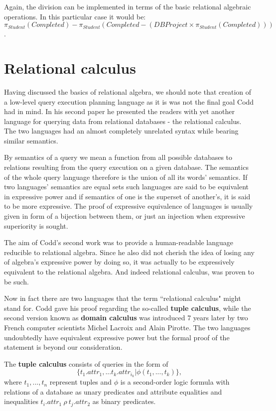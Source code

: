 \documentclass[12pt]{article}
\begin{document}
Again, the division can be implemented in terms of the basic relational algebraic operations.
In this particular case it would be: $$\pi_{Student}(Completed) - \pi_{Student}(Completed -
(DBProject \times \pi_{Student}(Completed)))$$.

\section{Relational calculus}

Having discussed the basics of relational algebra, we should note that
creation of a low-level query execution planning language as it is
was not the final goal Codd had in mind. In his second paper he presented the readers with yet
another language for querying data from relational databases - the relational calculus.
The two languages had an almost completely unrelated syntax while bearing similar semantics.

By semantics of a query we mean a function from all possible databases to relations resulting
from the query execution on a given database. The semantics of the whole query language therefore
is the union of all its words' semantics. If two languages' semantics are equal sets such languages
are said to be equivalent in expressive power and if semantics of one is the superset of another's,
it is said to be more expressive. The proof of expressive equivalence of languages is usually given in form of
a bijection between them, or just an injection when expressive superiority is sought.

The aim of Codd's second work was to provide a human-readable language reducible to relational
algebra. Since he also did not cherish the idea of losing any of algebra's expressive power
by doing so, it was actually to be expressively equivalent to the relational algebra.
And indeed relational calculus, was proven to be such.

Now in fact there are two languages that the term ``relational calculus" might stand for. Codd gave his proof
regarding the so-called \textbf{tuple calculus}, while the second version known as \textbf{domain calculus}
was introduced 7 years later by two French computer scientists Michel Lacroix and Alain Pirotte.
The two languages undoubtedly have equivalent expressive power but the formal proof of the statement is
beyond our consideration.

The \textbf{tuple calculus} consists of queries in the form of
$$\{t_1.attr_1, ... t_k.attr_{i_k} | \phi(t_1, ..., t_k)\},$$
where $t_1, ..., t_n$ represent tuples
and $\phi$ is a second-order logic formula with relations of a database as unary predicates and
attribute equalities and inequalities $t_i.attr_1\ \rho\ t_j.attr_2$ as binary predicates.
\end{document}
